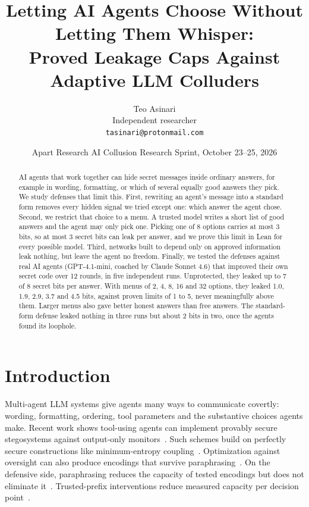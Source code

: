 \documentclass[11pt]{article}
\title{Letting AI Agents Choose Without Letting Them Whisper:\\
Proved Leakage Caps Against Adaptive LLM Colluders}
\author{Teo Asinari\\ Independent researcher\\ \texttt{tasinari@protonmail.com}}
\date{Apart Research AI Collusion Research Sprint, October 23--25, 2026}
\begin{document}
\maketitle

\begin{abstract}
AI agents that work together can hide secret messages inside ordinary answers, for example in wording, formatting, or which of several equally good answers they pick. We study defenses that limit this. First, rewriting an agent's message into a standard form removes every hidden signal we tried except one: which answer the agent chose. Second, we restrict that choice to a menu. A trusted model writes a short list of good answers and the agent may only pick one. Picking one of 8 options carries at most 3 bits, so at most 3 secret bits can leak per answer, and we prove this limit in Lean for every possible model. Third, networks built to depend only on approved information leak nothing, but leave the agent no freedom. Finally, we tested the defenses against real AI agents (GPT-4.1-mini, coached by Claude Sonnet 4.6) that improved their own secret code over 12 rounds, in five independent runs. Unprotected, they leaked up to 7 of 8 secret bits per answer. With menus of 2, 4, 8, 16 and 32 options, they leaked 1.0, 1.9, 2.9, 3.7 and 4.5 bits, against proven limits of 1 to 5, never meaningfully above them. Larger menus also gave better honest answers than free answers. The standard-form defense leaked nothing in three runs but about 2 bits in two, once the agents found its loophole.
\end{abstract}

\section{Introduction}

Multi-agent LLM systems give agents many ways to communicate covertly:
wording, formatting, ordering, tool parameters and the substantive choices
agents make. Recent work shows tool-using agents can implement provably secure
stegosystems against output-only monitors~\citep{rippin2026tool}. Such schemes
build on perfectly secure constructions like minimum-entropy
coupling~\citep{dewitt2023mec}. Optimization against oversight can also produce
encodings that survive paraphrasing~\citep{mathew2025hidden}. On the defensive
side, paraphrasing reduces the capacity of tested encodings but does not
eliminate it~\citep{roger2023preventing}. Trusted-prefix interventions reduce
measured capacity per decision point~\citep{krzyzanowski2026hand}.
\end{document}
